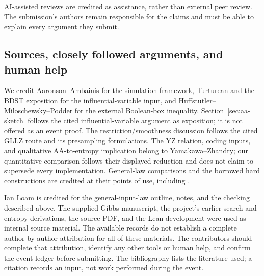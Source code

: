 \documentclass[11pt]{article}
\theoremstyle{definition}\newtheorem{definition}[theorem]{Definition}
\theoremstyle{remark}\newtheorem{remark}[theorem]{Remark}
\begin{document}
AI-assisted reviews are credited as assistance, rather than external peer review. The submission's authors remain responsible for the claims and must be able to explain every argument they submit.

\subsection{Sources, closely followed arguments, and human help}
We credit Aaronson--Ambainis for the simulation framework, Turturean and the BDST exposition for the influential-variable input, and Huffstutler--Miloschewsky--Podder for the external Boolean-box inequality. Section~\ref{sec:aa-sketch} follows the cited influential-variable argument as exposition; it is not offered as an event proof. The restriction/smoothness discussion follows the cited GLLZ route and its presampling formulations. The YZ relation, coding inputs, and qualitative AA-to-entropy implication belong to Yamakawa--Zhandry; our quantitative comparison follows their displayed reduction and does not claim to supersede every implementation. General-law comparisons and the borrowed hard constructions are credited at their points of use, including \cite{GMNR26,Sim97,AA15,vD02}.

Ian Loam is credited for the general-input-law outline, notes, and the checking described above. The supplied Gibbs manuscript, the project's earlier search and entropy derivations, the source PDF, and the Lean development were used as internal source material. The available records do not establish a complete author-by-author attribution for all of these materials. The contributors should complete that attribution, identify any other tools or human help, and confirm the event ledger before submitting. The bibliography lists the literature used; a citation records an input, not work performed during the event.
\end{document}
